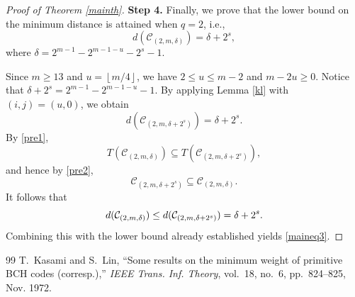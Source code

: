 \documentclass[10pt,a4paper]{amsart}
\begin{document}
\begin{proof}[Proof of Theorem \ref{mainth}]
{\bf Step 4.} Finally, we prove that the lower bound on the minimum distance is attained
when $q=2$, i.e.,
\begin{equation}\label{maineq3}
d(\mathcal{C}_{(2,m,\delta)}) = \delta+{2}^s,
\end{equation}
where $\delta=2^{m-1}-2^{m-1-u}-2^s-1$. 

Since $m\geq 13$ and $u=\left\lfloor m/4\right\rfloor$, we have
$2\leq u\leq m-2$ and $m-2u\geq0$. Notice that $\delta+2^s=2^{m-1}-2^{m-1-u}-1$. 
By applying Lemma \ref{kl} with $(i,j)=(u,0)$, we obtain 
\begin{equation*}
d(\mathcal{C}_{(2,m,\delta+2^s)}) = \delta+2^s.
\end{equation*}
By \eqref{pre1},
\begin{equation*} T(\mathcal{C}_{(2,m,\delta)})  \subseteq T(\mathcal{C}_{(2,m,\delta+2^s)}), 
\end{equation*}
and hence  by \eqref{pre2}, 
\begin{equation*}  \mathcal{C}_{(2,m,\delta+2^s)} \subseteq \mathcal{C}_{(2,m,\delta)}.
\end{equation*}
It follows that 
\begin{equation}\notag
d(\mathcal{C}_{(2,m,\delta)})
\leq d(\mathcal{C}_{(2,m,\delta+2^s)})
= \delta+2^s. 
\end{equation}
Combining this with the lower bound already established yields \eqref{maineq3}.
\end{proof}

\begin{thebibliography}{99}
 T.~Kasami and S.~Lin, ``Some results on the minimum weight of primitive BCH codes (corresp.),'' {\em IEEE Trans. Inf. Theory}, vol.~18, no.~6, pp.~824--825, Nov. 1972.
\end{thebibliography}
\end{document}
